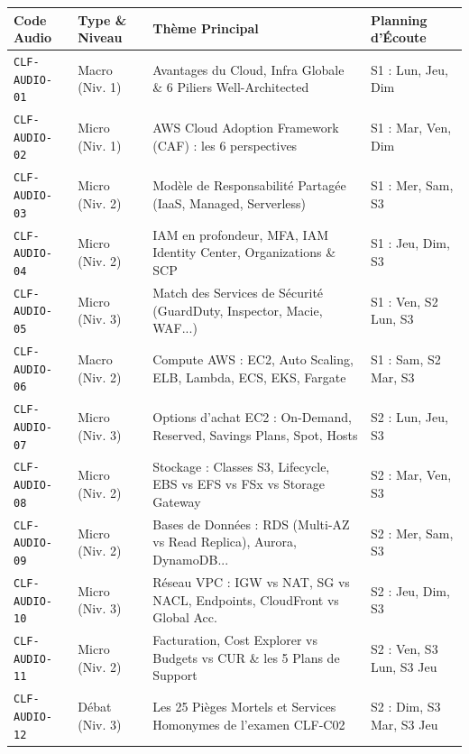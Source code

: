\documentclass[11pt,a4paper]{article}
\begin{document}
\begin{table}[h!]
\centering
\small
\begin{tabularx}{\textwidth}{l l X l}
\toprule
\textbf{Code Audio} & \textbf{Type \& Niveau} & \textbf{Thème Principal} & \textbf{Planning d'Écoute} \\
\midrule
\texttt{CLF-AUDIO-01} & Macro (Niv. 1) & Avantages du Cloud, Infra Globale \& 6 Piliers Well-Architected & S1 : Lun, Jeu, Dim \\
\texttt{CLF-AUDIO-02} & Micro (Niv. 1) & AWS Cloud Adoption Framework (CAF) : les 6 perspectives & S1 : Mar, Ven, Dim \\
\texttt{CLF-AUDIO-03} & Micro (Niv. 2) & Modèle de Responsabilité Partagée (IaaS, Managed, Serverless) & S1 : Mer, Sam, S3 \\
\texttt{CLF-AUDIO-04} & Micro (Niv. 2) & IAM en profondeur, MFA, IAM Identity Center, Organizations \& SCP & S1 : Jeu, Dim, S3 \\
\texttt{CLF-AUDIO-05} & Micro (Niv. 3) & Match des Services de Sécurité (GuardDuty, Inspector, Macie, WAF...) & S1 : Ven, S2 Lun, S3 \\
\texttt{CLF-AUDIO-06} & Macro (Niv. 2) & Compute AWS : EC2, Auto Scaling, ELB, Lambda, ECS, EKS, Fargate & S1 : Sam, S2 Mar, S3 \\
\texttt{CLF-AUDIO-07} & Micro (Niv. 3) & Options d'achat EC2 : On-Demand, Reserved, Savings Plans, Spot, Hosts & S2 : Lun, Jeu, S3 \\
\texttt{CLF-AUDIO-08} & Micro (Niv. 2) & Stockage : Classes S3, Lifecycle, EBS vs EFS vs FSx vs Storage Gateway & S2 : Mar, Ven, S3 \\
\texttt{CLF-AUDIO-09} & Micro (Niv. 2) & Bases de Données : RDS (Multi-AZ vs Read Replica), Aurora, DynamoDB... & S2 : Mer, Sam, S3 \\
\texttt{CLF-AUDIO-10} & Micro (Niv. 3) & Réseau VPC : IGW vs NAT, SG vs NACL, Endpoints, CloudFront vs Global Acc. & S2 : Jeu, Dim, S3 \\
\texttt{CLF-AUDIO-11} & Micro (Niv. 2) & Facturation, Cost Explorer vs Budgets vs CUR \& les 5 Plans de Support & S2 : Ven, S3 Lun, S3 Jeu \\
\texttt{CLF-AUDIO-12} & Débat (Niv. 3) & Les 25 Pièges Mortels et Services Homonymes de l'examen CLF-C02 & S2 : Dim, S3 Mar, S3 Jeu \\
\bottomrule
\end{tabularx}
\end{table}

\newpage

\end{document}
